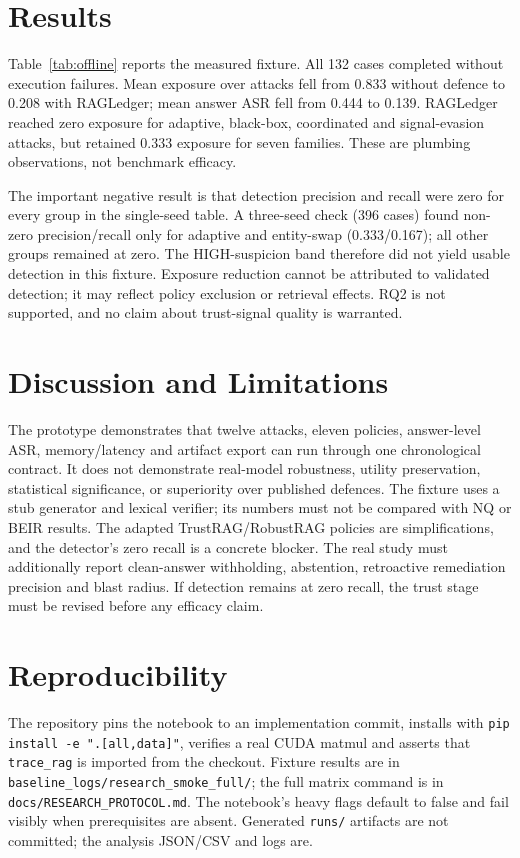 \documentclass[conference]{IEEEtran}
\begin{document}
\section{Results}
Table~\ref{tab:offline} reports the measured fixture. All 132 cases completed
without execution failures. Mean exposure over attacks fell from 0.833 without
defence to 0.208 with RAGLedger; mean answer ASR fell from 0.444 to 0.139.
RAGLedger reached zero exposure for adaptive, black-box, coordinated and
signal-evasion attacks, but retained 0.333 exposure for seven families. These
are plumbing observations, not benchmark efficacy.

The important negative result is that detection precision and recall were zero
for every group in the single-seed table. A three-seed check (396 cases) found
non-zero precision/recall only for adaptive and entity-swap (0.333/0.167); all
other groups remained at zero. The HIGH-suspicion band therefore did not yield
usable detection in this fixture. Exposure reduction cannot be attributed to
validated detection; it may reflect policy exclusion or retrieval effects. RQ2
is not supported, and no claim about trust-signal quality is warranted.
\section{Discussion and Limitations}
The prototype demonstrates that twelve attacks, eleven policies, answer-level
ASR, memory/latency and artifact export can run through one chronological
contract. It does not demonstrate real-model robustness, utility preservation,
statistical significance, or superiority over published defences. The fixture
uses a stub generator and lexical verifier; its numbers must not be compared
with NQ or BEIR results. The adapted TrustRAG/RobustRAG policies are
simplifications, and the detector's zero recall is a concrete blocker.
The real study must additionally report clean-answer withholding, abstention,
retroactive remediation precision and blast radius. If detection remains at
zero recall, the trust stage must be revised before any efficacy claim.
\section{Reproducibility}
The repository pins the notebook to an implementation commit, installs with
\texttt{pip install -e ".[all,data]"}, verifies a real CUDA matmul and asserts
that \texttt{trace\_rag} is imported from the checkout. Fixture results are in
\texttt{baseline\_logs/research\_smoke\_full/}; the full matrix command is in
\texttt{docs/RESEARCH\_PROTOCOL.md}. The notebook's heavy flags default to
false and fail visibly when prerequisites are absent. Generated \texttt{runs/}
artifacts are not committed; the analysis JSON/CSV and logs are.
\end{document}
